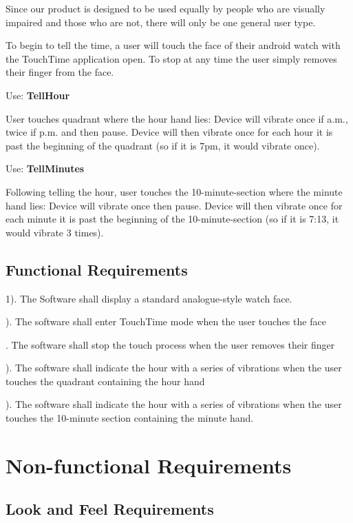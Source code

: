 \documentclass[12pt, titlepage]{article}
\begin{document}
Since our product is designed to be used equally by people who are visually impaired and those who are not, there will only be one general user type.
\vspace{2mm}

To begin to tell the time, a user will touch the face of their android watch with the TouchTime application open. To stop at any time the user simply removes their finger from the face.
\vspace{2mm}

\noindent Use: \textbf{TellHour}

User touches quadrant where the hour hand lies:
	Device will vibrate once if a.m., twice if p.m. and then pause.
	Device will then vibrate once for each hour it is past the beginning of the quadrant (so if it is 7pm, it would vibrate once).
\vspace{2mm}

\noindent Use: \textbf{TellMinutes}

Following telling the hour, user touches the 10-minute-section where the minute hand lies:
	Device will vibrate once then pause.
	Device will then vibrate once for each minute it is past the beginning of the 10-minute-section (so if it is 7:13, it would vibrate 3 times).

\newpage
\subsection{Functional Requirements}

1). The Software shall display a standard analogue-style watch face.

). The software shall enter TouchTime mode when the user touches the face

. The software shall stop the touch process when the user removes their finger

). The software shall indicate the hour with a series of vibrations when the user touches the quadrant containing the hour hand

). The software shall indicate the hour with a series of vibrations when the user touches the 10-minute section containing the minute hand.

\section{Non-functional Requirements}

\subsection{Look and Feel Requirements}
\end{document}

